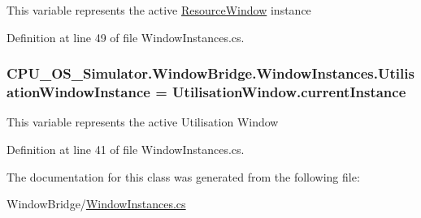 This variable represents the active \hyperlink{class_c_p_u___o_s___simulator_1_1_resource_window}{Resource\+Window} instance 



Definition at line 49 of file Window\+Instances.\+cs.

\hypertarget{class_c_p_u___o_s___simulator_1_1_window_bridge_1_1_window_instances_a011cba976727ec53f3667730d137168d}{}
\subsubsection[{Utilisation\+Window\+Instance}]{ C\+P\+U\+\_\+\+O\+S\+\_\+\+Simulator.\+Window\+Bridge.\+Window\+Instances.\+Utilisation\+Window\+Instance = {\bf Utilisation\+Window.\+current\+Instance}\hspace{0.3cm}{\ttfamily [static]}}\label{class_c_p_u___o_s___simulator_1_1_window_bridge_1_1_window_instances_a011cba976727ec53f3667730d137168d}


This variable represents the active Utilisation Window 



Definition at line 41 of file Window\+Instances.\+cs.



The documentation for this class was generated from the following file\+:\begin{DoxyCompactItemize}
\item 
Window\+Bridge/\hyperlink{_window_instances_8cs}{Window\+Instances.\+cs}\end{DoxyCompactItemize}

